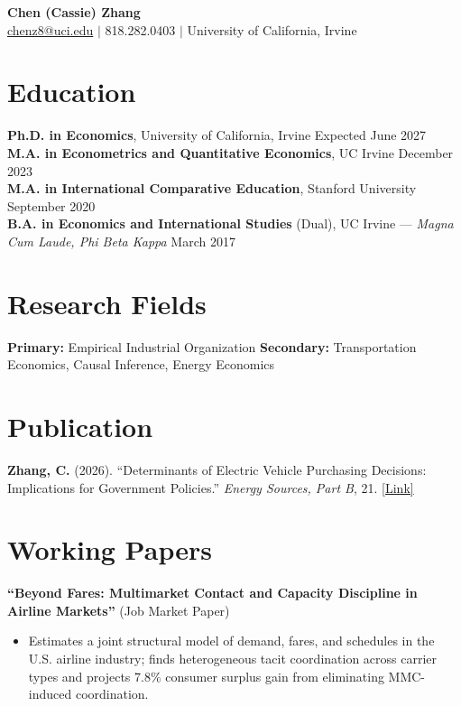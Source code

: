 \documentclass[11pt,letterpaper]{article}
\begin{document}
\begin{center}
{\Large\textbf{Chen (Cassie) Zhang}}\\[4pt]
\href{mailto:chenz8@uci.edu}{chenz8@uci.edu} $\vert$ 818.282.0403 $\vert$ University of California, Irvine
\end{center}

\section{Education}
\textbf{Ph.D. in Economics}, University of California, Irvine \hfill Expected June 2027\\
\textbf{M.A. in Econometrics and Quantitative Economics}, UC Irvine \hfill December 2023\\
\textbf{M.A. in International Comparative Education}, Stanford University \hfill September 2020\\
\textbf{B.A. in Economics and International Studies} (Dual), UC Irvine --- \textit{Magna Cum Laude, Phi Beta Kappa} \hfill March 2017

\section{Research Fields}
\textbf{Primary:} Empirical Industrial Organization \quad\textbf{Secondary:} Transportation Economics, Causal Inference, Energy Economics

\section{Publication}
\textbf{Zhang, C.} (2026). ``Determinants of Electric Vehicle Purchasing Decisions: Implications for Government Policies.'' \textit{Energy Sources, Part B}, 21. \href{https://doi.org/10.1080/15567249.2026.2682530}{[Link]}

\section{Working Papers}
\textbf{``Beyond Fares: Multimarket Contact and Capacity Discipline in Airline Markets''} (Job Market Paper)
\begin{itemize}[nosep,leftmargin=1.5em,topsep=2pt]
  \item Estimates a joint structural model of demand, fares, and schedules in the U.S. airline industry; finds heterogeneous tacit coordination across carrier types and projects 7.8\% consumer surplus gain from eliminating MMC-induced coordination.
\end{itemize}
\end{document}
